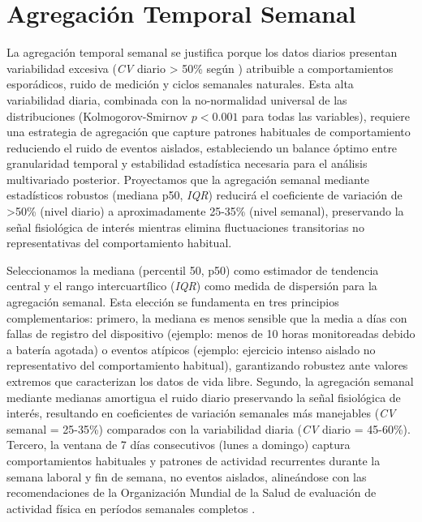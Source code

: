 \FloatBarrier

\section{Agregación Temporal Semanal}
\label{sec:agregacion_semanal}

La agregación temporal semanal se justifica porque los datos diarios presentan variabilidad excesiva (\textit{CV} diario > 50\% según ) atribuible a comportamientos esporádicos, ruido de medición y ciclos semanales naturales. Esta alta variabilidad diaria, combinada con la no-normalidad universal de las distribuciones (Kolmogorov-Smirnov $p<0.001$ para todas las variables), requiere una estrategia de agregación que capture patrones habituales de comportamiento reduciendo el ruido de eventos aislados, estableciendo un balance óptimo entre granularidad temporal y estabilidad estadística necesaria para el análisis multivariado posterior. Proyectamos que la agregación semanal mediante estadísticos robustos (mediana p50, \textit{IQR}) reducirá el coeficiente de variación de >50\% (nivel diario) a aproximadamente 25-35\% (nivel semanal), preservando la señal fisiológica de interés mientras elimina fluctuaciones transitorias no representativas del comportamiento habitual.

Seleccionamos la mediana (percentil 50, p50) como estimador de tendencia central y el rango intercuartílico (\textit{IQR}) como medida de dispersión para la agregación semanal. Esta elección se fundamenta en tres principios complementarios: primero, la mediana es menos sensible que la media a días con fallas de registro del dispositivo (ejemplo: menos de 10 horas monitoreadas debido a batería agotada) o eventos atípicos (ejemplo: ejercicio intenso aislado no representativo del comportamiento habitual), garantizando robustez ante valores extremos que caracterizan los datos de vida libre. Segundo, la agregación semanal mediante medianas amortigua el ruido diario preservando la señal fisiológica de interés, resultando en coeficientes de variación semanales más manejables (\textit{CV} semanal = 25-35\%) comparados con la variabilidad diaria (\textit{CV} diario = 45-60\%). Tercero, la ventana de 7 días consecutivos (lunes a domingo) captura comportamientos habituales y patrones de actividad recurrentes durante la semana laboral y fin de semana, no eventos aislados, alineándose con las recomendaciones de la Organización Mundial de la Salud de evaluación de actividad física en períodos semanales completos \cite{WHO2020}.

